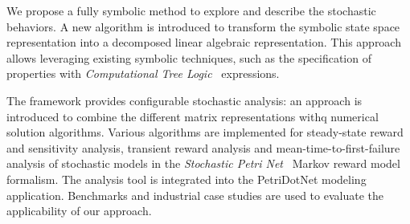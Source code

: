 We propose a fully symbolic method to explore and describe the
stochastic behaviors. A new algorithm is introduced to transform the
symbolic state space representation into a decomposed linear algebraic
representation. This approach allows leveraging existing symbolic
techniques, such as the specification of properties with
\emph{Computational Tree Logic}~ expressions.

The framework provides configurable stochastic analysis: an approach
is introduced to combine the different matrix representations withq
numerical solution algorithms. Various algorithms are implemented for
steady-state reward and sensitivity analysis, transient reward
analysis and mean-time-to-first-failure analysis of stochastic models
in the \emph{Stochastic Petri Net}~ Markov reward
model formalism. The analysis tool is integrated into the PetriDotNet
modeling application.  Benchmarks and industrial case studies are used
to evaluate the applicability of our approach.
